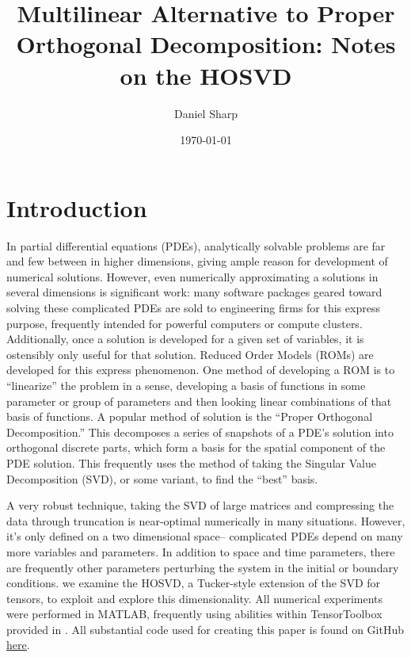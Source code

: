 \documentclass[12pt]{article}
\title{Multilinear Alternative to Proper Orthogonal Decomposition: Notes on the HOSVD}
\author{Daniel Sharp}
\date{\today}
\begin{document}
    \maketitle
    \section{Introduction}
    In partial differential equations (PDEs), analytically solvable problems are far and few between in higher dimensions, giving ample reason for development of numerical solutions. However, even numerically approximating a solutions in several dimensions is significant work: many software packages geared toward solving these complicated PDEs are sold to engineering firms for this express purpose, frequently intended for powerful computers or compute clusters. Additionally, once a solution is developed for a given set of variables, it is ostensibly only useful for that solution. Reduced Order Models (ROMs) are developed for this express phenomenon. One method of developing a ROM is to ``linearize'' the problem in a sense, developing a basis of functions in some parameter or group of parameters and then looking linear combinations of that basis of functions. A popular method of solution is the ``Proper Orthogonal Decomposition.'' This decomposes a series of snapshots of a PDE's solution into orthogonal discrete parts, which form a basis for the spatial component of the PDE solution. This frequently uses the method of taking the Singular Value Decomposition (SVD), or some variant, to find the ``best'' basis.

    A very robust technique, taking the SVD of large matrices and compressing the data through truncation is near-optimal numerically in many situations. However, it's only defined on a two dimensional space-- complicated PDEs depend on many more variables and parameters. In addition to space and time parameters, there are frequently other parameters perturbing the system in the initial or boundary conditions. we examine the HOSVD, a Tucker-style extension of the SVD for tensors, to exploit and explore this dimensionality. All numerical experiments were performed in MATLAB, frequently using abilities within TensorToolbox provided in \cite{ttb}. All substantial code used for creating this paper is found on GitHub \underline{\href{https://github.com/dannys4/hosvd_pde_exploration}{here}}.
\end{document}
